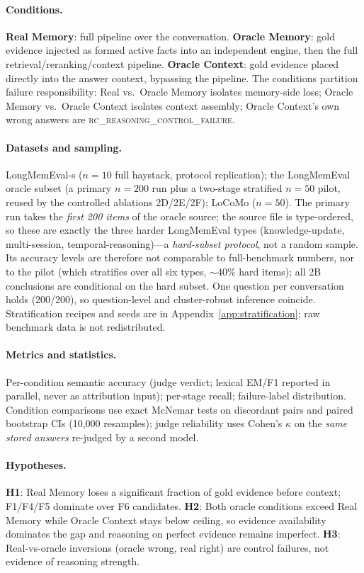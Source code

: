 \documentclass[11pt]{article}
\newcommand{\rcfailure}{\textsc{rc\_reasoning\_control\_failure}}
\begin{document}
\paragraph{Conditions.}
\textbf{Real Memory}: full pipeline over the conversation.
\textbf{Oracle Memory}: gold evidence injected as formed active facts into
an independent engine, then the full retrieval/reranking/context pipeline.
\textbf{Oracle Context}: gold evidence placed directly into the answer
context, bypassing the pipeline. The conditions partition failure
responsibility: Real vs.\ Oracle Memory isolates memory-side loss; Oracle
Memory vs.\ Oracle Context isolates context assembly; Oracle Context's
own wrong answers are \rcfailure{}.

\paragraph{Datasets and sampling.}
LongMemEval-s ($n{=}10$ full haystack, protocol replication); the
LongMemEval oracle subset (a primary $n{=}200$ run plus a two-stage
stratified $n{=}50$ pilot, reused by the controlled ablations
2D/2E/2F); LoCoMo ($n{=}50$). The primary run takes the \emph{first 200
items} of the oracle source; the source file is type-ordered, so these
are exactly the three harder LongMemEval types (knowledge-update,
multi-session, temporal-reasoning)---a \emph{hard-subset protocol},
not a random sample. Its accuracy levels are therefore not comparable
to full-benchmark numbers, nor to the pilot (which stratifies over all
six types, ${\sim}40\%$ hard items); all 2B conclusions are conditional
on the hard subset. One question per conversation holds (200/200), so
question-level and cluster-robust inference coincide. Stratification
recipes and seeds are in Appendix~\ref{app:stratification}; raw
benchmark data is not redistributed.

\paragraph{Metrics and statistics.}
Per-condition semantic accuracy (judge verdict; lexical EM/F1 reported in
parallel, never as attribution input); per-stage recall; failure-label
distribution. Condition comparisons use exact McNemar tests on discordant
pairs and paired bootstrap CIs (10,000 resamples); judge reliability uses
Cohen's $\kappa$ on the \emph{same stored answers} re-judged by a second
model.

\paragraph{Hypotheses.}
\textbf{H1}: Real Memory loses a significant fraction of gold evidence
before context; F1/F4/F5 dominate over F6 candidates.
\textbf{H2}: Both oracle conditions exceed Real Memory while Oracle
Context stays below ceiling, so evidence availability dominates the gap
and reasoning on perfect evidence remains imperfect.
\textbf{H3}: Real-vs-oracle inversions (oracle wrong, real right) are
control failures, not evidence of reasoning strength.
\end{document}

